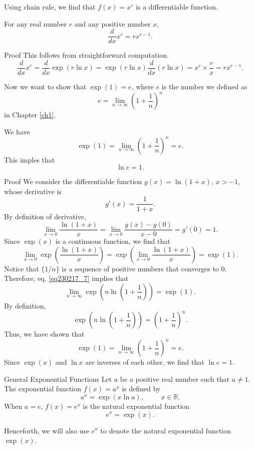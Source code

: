Using chain rule, we find that $f(x)=x^r$ is a differentiable function.
\begin{proposition}{}
For any real number $r$ and any positive number $x$,
\[\frac{d}{dx}x^r=rx^{r-1}.\]
\end{proposition}
\begin{myproof}{Proof}
This follows from straightforward computation.
\[\frac{d}{dx}x^r=\frac{d}{dx}\exp\left(r\ln x\right)= \exp(r\ln x)\frac{d}{dx}(r\ln x)=x^r\times\frac{r}{x}=rx^{r-1}.\]
\end{myproof}

Now we want to show that $\exp(1)=e$, where $e$ is the number we defined as
\[e=\lim_{n\to \infty}\left(1+\frac{1}{n}\right)^n\] in Chapter \ref{ch1}.

\begin{theorem}[label=thm230218_1]{} We have
\[\exp(1) =\lim_{n\to\infty}\left(1+\frac{1}{n}\right)^n=e.\]This imples that
\[\ln e=1.\]
\end{theorem}
\begin{myproof}{Proof}
We consider the differentiable function $g(x)=\ln (1+x)$, $x>-1$, whose derivative is
\[g'(x)=\frac{1}{1+x}.\]   By definition of derivative, 
\[\lim_{x\to 0}\frac{\ln(1+x)}{x}=\lim_{x\to 0}\frac{g(x)-g(0)}{x-0}=g'(0)=1.\]
Since $\exp(x)$ is a continuous function, we find that
\begin{equation}\label{eq230217_7}\lim_{x\to 0 }\exp\left(\frac{\ln(1+x)}{x}\right)=\exp\left(\lim_{x\to 0 }\frac{\ln(1+x)}{x}\right)= \exp(1).\end{equation} 
Notice that $\{1/n\}$ is a sequence of positive numbers that converges to 0. Therefore, eq. \eqref{eq230217_7} implies that
\[\lim_{n\to \infty}\exp\left(n\ln\left(1+\frac{1}{n}\right)\right)=\exp(1).\] 
By definition,\[\exp\left(n\ln\left(1+\frac{1}{n}\right)\right)=\left(1+\frac{1}{n}\right)^n.\] Thus, we have shown that
\[\exp(1) =\lim_{n\to\infty}\left(1+\frac{1}{n}\right)^n=e.\]
Since $\exp(x)$ and $\ln x$ are inverses of each other, we find that $\ln e=1$.
\end{myproof}
 
\begin{definition}{General Exponential Functions}
Let $a$ be a positive real number such that $a\neq 1$. The exponential function $f(x)=a^x$ is defined by
\[a^x=\exp\left(x\ln a\right),\hspace{1cm}x\in\mathbb{R}.\]
When $a=e$, $f(x)=e^x$ is the natural exponential function 
\[e^x=\exp(x).\]
\end{definition}
Henceforth, we will also use $e^x$ to denote the natural exponential function $\exp(x)$. 


